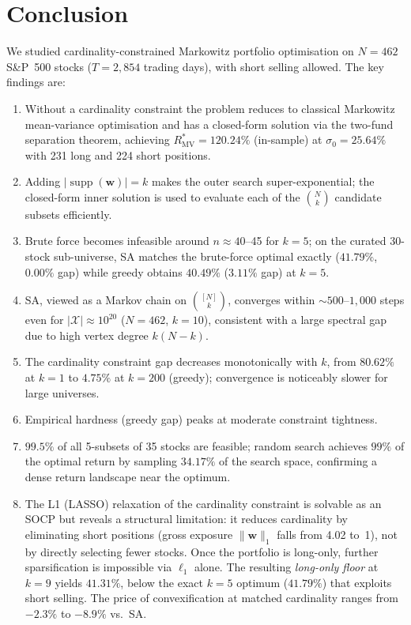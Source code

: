 \documentclass[11pt]{article}
\begin{document}
\section{Conclusion}
\label{sec:conclusion}

We studied cardinality-constrained Markowitz portfolio optimisation on $N=462$
S\&P~500 stocks ($T=2{,}854$ trading days), with short selling allowed.
The key findings are:
\begin{enumerate}[leftmargin=1.5em]
  \item Without a cardinality constraint the problem reduces to classical
    Markowitz mean-variance optimisation and has a closed-form solution via
    the two-fund separation theorem, achieving $R^*_{\text{MV}}=120.24\%$
    (in-sample) at $\sigma_0=25.64\%$ with 231 long and 224 short positions.
  \item Adding $|\operatorname{supp}(\mathbf{w})|=k$ makes the outer search
    super-exponential; the closed-form inner solution is used to evaluate
    each of the $\binom{N}{k}$ candidate subsets efficiently.
  \item Brute force becomes infeasible around $n\approx 40$--45 for $k=5$;
    on the curated 30-stock sub-universe, SA matches the brute-force optimal
    exactly ($41.79\%$, $0.00\%$ gap) while greedy obtains $40.49\%$
    ($3.11\%$ gap) at $k=5$.
  \item SA, viewed as a Markov chain on $\binom{[N]}{k}$, converges within
    $\sim\!500$--$1{,}000$ steps even for $|\mathcal{X}|\approx 10^{20}$
    ($N=462$, $k=10$), consistent with a large spectral gap due to high vertex
    degree $k(N-k)$.
  \item The cardinality constraint gap decreases monotonically with $k$, from
    $80.62\%$ at $k=1$ to $4.75\%$ at $k=200$ (greedy); convergence is
    noticeably slower for large universes.
  \item Empirical hardness (greedy gap) peaks at moderate constraint tightness.
  \item $99.5\%$ of all 5-subsets of 35 stocks are feasible; random search
    achieves $99\%$ of the optimal return by sampling $34.17\%$ of the search
    space, confirming a dense return landscape near the optimum.
  \item The L1 (LASSO) relaxation of the cardinality constraint is solvable as
    an SOCP but reveals a structural limitation: it reduces cardinality by
    eliminating short positions (gross exposure $\|\mathbf{w}\|_1$ falls from
    4.02 to~1), not by directly selecting fewer stocks.  Once the portfolio is
    long-only, further sparsification is impossible via $\ell_1$ alone.  The
    resulting \emph{long-only floor} at $k=9$ yields $41.31\%$, below the
    exact $k=5$ optimum ($41.79\%$) that exploits short selling.
    The price of convexification at matched cardinality ranges from $-2.3\%$
    to $-8.9\%$ vs.\ SA.
\end{enumerate}
\end{document}
